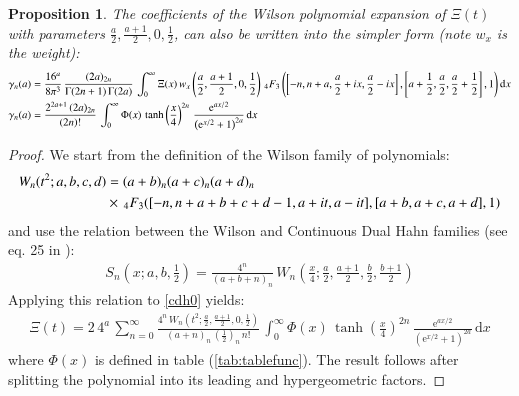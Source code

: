 \documentclass[a4paper,11pt,twoside]{amsart}
\newtheorem{proposition}[theorem]{Proposition}
\begin{document}
\begin{proposition}
The coefficients of the Wilson polynomial expansion of $\Xi(t)$ with parameters $\frac{a}{2},\frac{a+1}{2},0,\frac12$, can also be written into the simpler form (note $w_x$ is the weight):   
\begin{align}
 \gamma_n(a) &=\frac{16^a}{8\pi^3}\,\frac{(2a)_{2n}}{\Gamma(2n+1)\,\Gamma(2a)}\,\int_{0}^\infty \Xi(x)\,w_x\left(\frac{a}{2},\frac{a+1}{2},0,\frac12\right) \,{}_4F_3\left(\left[-n,n+a,\frac{a}{2}+ix, \frac{a}{2}-ix\right],\left[a+\frac12,\frac{a}{2},\frac{a}{2}+\frac12\right],1\right) \mathrm{d}x \\
 \gamma_n(a) &=\frac{2^{2a+1}\,(2a)_{2n}}{(2n)!}\,\int_{0}^\infty \Phi(x)\,\tanh\left(\frac{x}{4}\right)^{2n}\,\frac{\mathrm{e}^{ax/2}}{\left(\mathrm{e}^{x/2}+1\right)^{2a}} \, \mathrm{d}x \notag
\end{align}
\end{proposition}
\begin{proof}
We start from the definition of the Wilson family of polynomials:
\begin{align}
 W_n(t^2;a,b,c,d) &= (a+b)_n(a+c)_n(a+d)_n\, \\
  &\times\, {}_4F_3([-n, n+ a+b+c+d-1,a+it, a- it], [a+b, a+c, a+d], 1) \notag
\end{align}
and use the relation between the Wilson and Continuous Dual Hahn families (see eq. 25 in \cite{koesup}):
\begin{align}
 S_n\left(x;a,b,\frac12\right) = \frac{4^n}{(a+b+n)_n}\, W_n\left(\frac{x}{4};\frac{a}{2},\frac{a+1}{2},\frac{b}{2},\frac{b+1}{2}\right)
\end{align}
Applying this relation to \ref{cdh0} yields:
\begin{align}
  \Xi(t)= 2\,4^a\,\sum_{n=0}^\infty \frac{4^n\,W_n\left(t^2;\frac{a}{2},\frac{a+1}{2},0,\frac12\right)}{(a+n)_n\,\left(\frac12\right)_n\,n!}\,\int_{0}^{\infty} \Phi(x)\,\tanh\left(\frac{x}{4}\right)^{2n}\,\frac{\mathrm{e}^{ax/2}}{(\mathrm{e}^{x/2}+1)^{2a}}\,\mathrm{d}x
\end{align}
where $\Phi(x)$ is defined in table (\ref{tab:tablefunc}). The result follows after splitting the polynomial into its leading and hypergeometric factors.
\end{proof}
\end{document}
